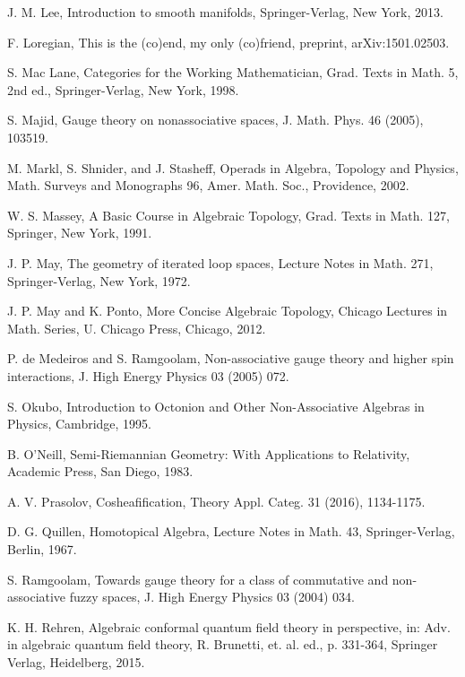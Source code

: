 \documentclass{amsbook}
\numberwithin{section}{chapter}
\numberwithin{subsection}{section}
\numberwithin{equation}{section}
\theoremstyle{plain}
\theoremstyle{definition}
\begin{document}
\begin{thebibliography}{AAAAAA}
J. M. Lee, Introduction to smooth manifolds, Springer-Verlag, New York, 2013.

F. Loregian, This is the (co)end, my only (co)friend, preprint, arXiv:1501.02503.

S. Mac Lane, Categories for the Working Mathematician, Grad. Texts in Math. 5, 2nd ed., Springer-Verlag, New York, 1998.

S. Majid, Gauge theory on nonassociative spaces, J. Math. Phys. 46 (2005), 103519.

M. Markl, S. Shnider, and J. Stasheff, Operads in Algebra, Topology and Physics, Math. Surveys and Monographs 96, Amer. Math. Soc., Providence, 2002.

W. S. Massey, A Basic Course in Algebraic Topology, Grad. Texts in Math. 127, Springer, New York, 1991.

J. P. May, The geometry of iterated loop spaces, Lecture Notes in Math. 271,
Springer-Verlag, New York, 1972.

J. P. May and K. Ponto, More Concise Algebraic Topology, Chicago Lectures in Math. Series, U. Chicago Press, Chicago, 2012.

P. de Medeiros and S. Ramgoolam, Non-associative gauge theory and higher spin interactions, J. High Energy Physics 03 (2005) 072.

S. Okubo, Introduction to Octonion and Other Non-Associative Algebras in Physics, Cambridge, 1995.

B. O'Neill, Semi-Riemannian Geometry: With Applications to Relativity, Academic Press, San Diego, 1983.

A. V. Prasolov, Cosheafification, Theory Appl. Categ. 31 (2016), 1134-1175.

D. G. Quillen, Homotopical Algebra, Lecture Notes in Math. 43, Springer-Verlag, Berlin, 1967.

S. Ramgoolam, Towards gauge theory for a class of commutative and non-associative fuzzy spaces, J. High Energy Physics 03 (2004) 034.

K. H. Rehren, Algebraic conformal quantum field theory in perspective, in: Adv. in algebraic quantum field theory, R. Brunetti, et. al. ed., p. 331-364, Springer Verlag, Heidelberg, 2015. 


\end{thebibliography}
\end{document}
